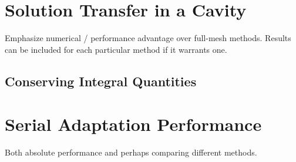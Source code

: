 \section{Solution Transfer in a Cavity}

Emphasize numerical / performance advantage
over full-mesh methods.
Results can be included for each particular
method if it warrants one.

\subsection{Conserving Integral Quantities}

\section{Serial Adaptation Performance}

Both absolute performance and perhaps comparing
different methods.



